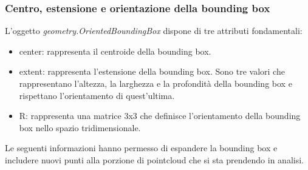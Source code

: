 \documentclass[italian]{article}
\begin{document}
\subsubsection{Centro, estensione e orientazione della bounding box}
L'oggetto \textit{geometry.OrientedBoundingBox} dispone di tre attributi fondamentali:
\begin{itemize}
	\item center: rappresenta il centroide della bounding box.
	\item extent: rappresenta l'estensione della bounding box. Sono tre valori che rappresentano l'altezza, la larghezza e la profondità della bounding box e rispettano l'orientamento di quest'ultima.
	\item R: rappresenta una matrice 3x3 che definisce l'orientamento della bounding box nello spazio tridimensionale.
\end{itemize}
Le seguenti informazioni hanno permesso di espandere la bounding box e includere nuovi punti alla porzione di pointcloud che si sta prendendo in analisi.
\end{document}
